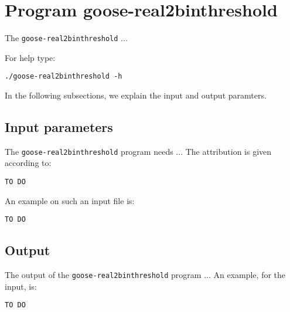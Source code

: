 \section{Program goose-real2binthreshold}
The \texttt{goose-real2binthreshold} ...

For help type:
\begin{lstlisting}
./goose-real2binthreshold -h
\end{lstlisting}
In the following subsections, we explain the input and output paramters.

\subsection{Input parameters}

The \texttt{goose-real2binthreshold} program needs ...
The attribution is given according to:
\begin{lstlisting}
TO DO
\end{lstlisting}

An example on such an input file is:
\begin{lstlisting}
TO DO
\end{lstlisting}

\subsection{Output}
The output of the \texttt{goose-real2binthreshold} program ...
An example, for the input, is:
\begin{lstlisting}
TO DO
\end{lstlisting}
